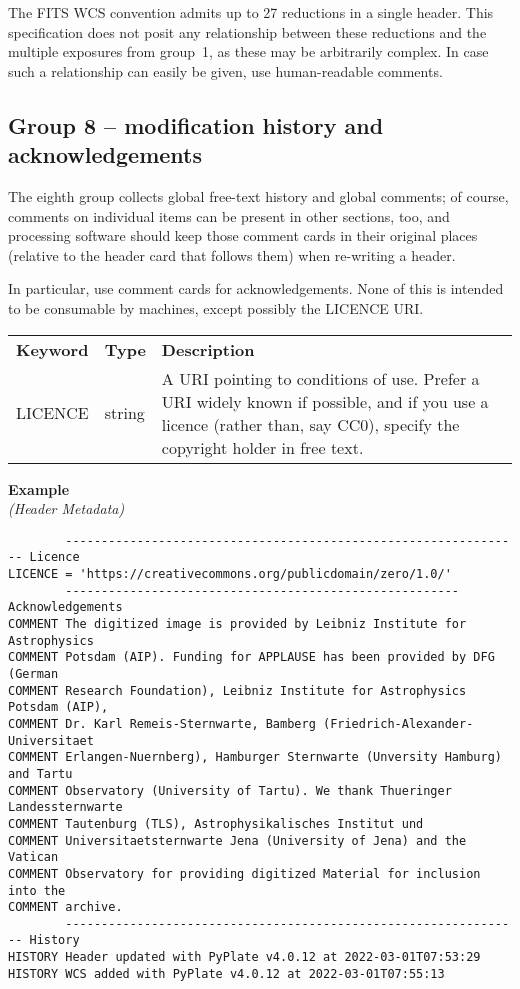 \documentclass[11pt]{ivoa}
\newenvironment{fitsexample}[1]
{\bigskip\noindent\textbf{Example}\\\textit{(#1)\smallskip}}
{\medskip}
\begin{document}
The FITS WCS convention admits up to 27 reductions in a single header.
This specification does not posit any relationship between these
reductions and the multiple exposures from group~1, as these may be
arbitrarily complex.  In case such a relationship can easily be given,
use human-readable comments.

\subsection{Group 8 – modification history and acknowledgements}

The eighth group collects global free-text history and global comments; of
course, comments on individual items can be present in other sections,
too, and processing software should keep those comment cards in their
original places (relative to the header card that follows them) when
re-writing a header.

In particular, use comment cards for acknowledgements.  None of this is
intended to be consumable by machines, except possibly the LICENCE URI.

\begin{inlinetable}
\footnotesize
\begin{tabular}{llp{}}
\sptablerule
\textbf{Keyword}&\textbf{Type}&\textbf{Description}\\
\sptablerule
LICENCE &string    &A URI pointing to conditions of use.  Prefer a
URI widely known if possible, and if you use a licence (rather than, say
CC0), specify the copyright holder in free text.\\
\end{tabular}
\end{inlinetable}


\begin{fitsexample}{Header Metadata}
\begin{lstlisting}
        ---------------------------------------------------------------- Licence
LICENCE = 'https://creativecommons.org/publicdomain/zero/1.0/'
        ------------------------------------------------------- Acknowledgements
COMMENT The digitized image is provided by Leibniz Institute for Astrophysics
COMMENT Potsdam (AIP). Funding for APPLAUSE has been provided by DFG (German
COMMENT Research Foundation), Leibniz Institute for Astrophysics Potsdam (AIP),
COMMENT Dr. Karl Remeis-Sternwarte, Bamberg (Friedrich-Alexander-Universitaet
COMMENT Erlangen-Nuernberg), Hamburger Sternwarte (Unversity Hamburg) and Tartu
COMMENT Observatory (University of Tartu). We thank Thueringer Landessternwarte
COMMENT Tautenburg (TLS), Astrophysikalisches Institut und
COMMENT Universitaetsternwarte Jena (University of Jena) and the Vatican
COMMENT Observatory for providing digitized Material for inclusion into the
COMMENT archive.
        ---------------------------------------------------------------- History
HISTORY Header updated with PyPlate v4.0.12 at 2022-03-01T07:53:29
HISTORY WCS added with PyPlate v4.0.12 at 2022-03-01T07:55:13
\end{lstlisting}
\end{fitsexample}
\end{document}
